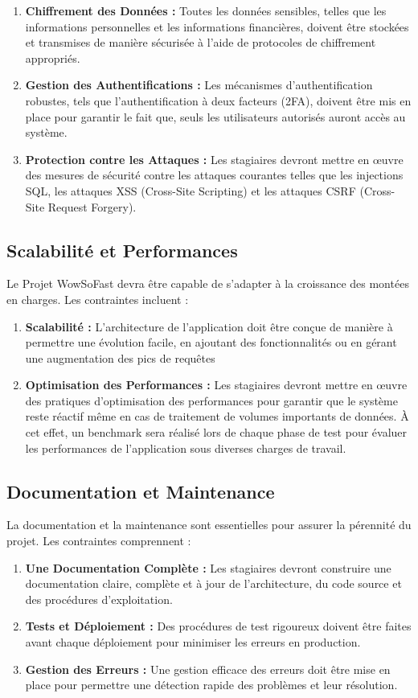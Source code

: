 {\begin{enumerate}
    \item \textbf{Chiffrement des Données :} Toutes les données sensibles, telles que les informations personnelles et les informations financières, doivent être stockées et transmises de manière sécurisée à l'aide de protocoles de chiffrement appropriés.
    \item \textbf{Gestion des Authentifications :} Les mécanismes d'authentification robustes, tels que l'authentification à deux facteurs (2FA), doivent être mis en place pour garantir le fait que, seuls les utilisateurs autorisés auront accès au système.
    \item \textbf{Protection contre les Attaques :} Les stagiaires devront mettre en œuvre des mesures de sécurité contre les attaques courantes telles que les injections SQL, les attaques XSS (Cross-Site Scripting) et les attaques CSRF (Cross-Site Request Forgery).
\end{enumerate}

\subsection{Scalabilité et Performances}
Le Projet WowSoFast devra être capable de s'adapter à la croissance des montées en charges. Les contraintes incluent :
\begin{enumerate}
    \item \textbf{Scalabilité :} L'architecture de l'application doit être conçue de manière à permettre une évolution facile, en ajoutant des fonctionnalités ou en gérant une augmentation des pics de requêtes
    \item \textbf{Optimisation des Performances :} Les stagiaires devront mettre en œuvre des pratiques d'optimisation des performances pour garantir que le système reste réactif même en cas de traitement de volumes importants de données. À cet effet, un benchmark sera réalisé lors de chaque phase de test pour évaluer les performances de l'application sous diverses charges de travail.
\end{enumerate}

\subsection{Documentation et Maintenance}
La documentation et la maintenance sont essentielles pour assurer la pérennité du projet. Les contraintes comprennent :
\begin{enumerate}
    \item \textbf{Une Documentation Complète :} Les stagiaires devront construire une documentation claire, complète et à jour de l'architecture, du code source et des procédures d'exploitation.
    \item \textbf{Tests et Déploiement :} Des procédures de test rigoureux doivent être faites avant chaque déploiement pour minimiser les erreurs en production.
    \item \textbf{Gestion des Erreurs :} Une gestion efficace des erreurs doit être mise en place pour permettre une détection rapide des problèmes et leur résolution.
\end{enumerate}

}

